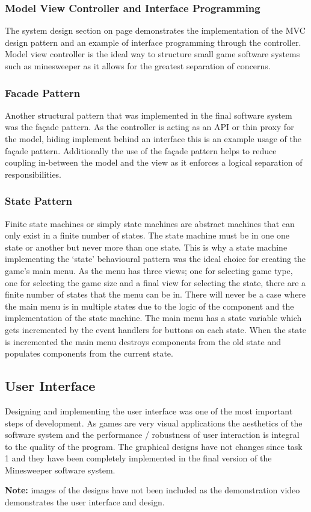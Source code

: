 \documentclass[12pt, a4]{report}
\begin{document}
\subsubsection{Model View Controller and Interface Programming}
The system design section on page \pageref{SystemDesign} demonstrates the implementation of the MVC design pattern and an example of interface programming through the controller. Model view controller is the ideal way to structure small game software systems such as minesweeper as it allows for the greatest separation of concerns.

\subsubsection{Facade Pattern}
Another structural pattern that was implemented in the final software system was the façade pattern. As the controller is acting as an API or thin proxy for the model, hiding implement behind an interface this is an example usage of the façade pattern. Additionally the use of the façade pattern helps to reduce coupling in-between the model and the view as it enforces a logical separation of responsibilities.

\subsubsection{State Pattern}
Finite state machines or simply state machines are abstract machines that can only exist in a finite number of states. The state machine must be in one one state or another but never more than one state. This is why a state machine implementing the `state' behavioural pattern was the ideal choice for creating the game's main menu. As the menu has three views; one for selecting game type, one for selecting the game size and a final view for selecting the state, there are a finite number of states that the menu can be in. There will never be a case where the main menu is in multiple states due to the logic of the component and the implementation of the state machine. The main menu has a state variable which gets incremented by the event handlers for buttons on each state. When the state is incremented the main menu destroys components from the old state and populates components from the current state.

\subsection{User Interface}
Designing and implementing the user interface was one of the most important steps of development. As games are very visual applications the aesthetics of the software system and the performance / robustness of user interaction is integral to the quality of the program. The graphical designs have not changes since task 1 and they have been completely implemented in the final version of the Minesweeper software system.
\newline\par
\textbf{Note:} images of the designs have not been included as the demonstration video demonstrates the user interface and design.
\end{document}
